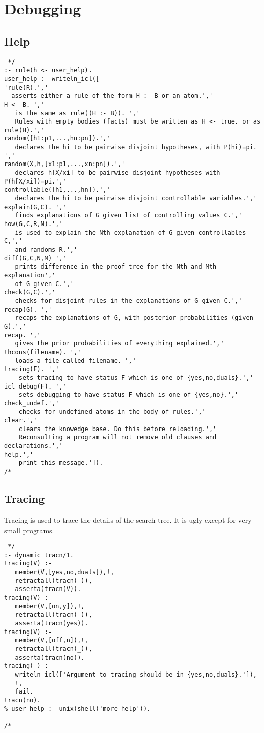 \documentclass[11pt,fleqn]{article}
\begin{document}
\section{Debugging}
\subsection{Help}
\begin{verbatim} */
:- rule(h <- user_help).
user_help :- writeln_icl([
'rule(R).','
  asserts either a rule of the form H :- B or an atom.','
H <- B. ','
   is the same as rule((H :- B)). ','
   Rules with empty bodies (facts) must be written as H <- true. or as rule(H).','
random([h1:p1,...,hn:pn]).','
   declares the hi to be pairwise disjoint hypotheses, with P(hi)=pi. ','
random(X,h,[x1:p1,...,xn:pn]).','
   declares h[X/xi] to be pairwise disjoint hypotheses with P(h[X/xi])=pi.','
controllable([h1,...,hn]).','
   declares the hi to be pairwise disjoint controllable variables.','
explain(G,C). ','
   finds explanations of G given list of controlling values C.','
how(G,C,R,N).','
   is used to explain the Nth explanation of G given controllables C,','
   and randoms R.',' 
diff(G,C,N,M) ','
   prints difference in the proof tree for the Nth and Mth explanation','
   of G given C.','
check(G,C).','
   checks for disjoint rules in the explanations of G given C.','
recap(G). ','
   recaps the explanations of G, with posterior probabilities (given G).','
recap. ','
   gives the prior probabilities of everything explained.','
thcons(filename). ','
   loads a file called filename. ','
tracing(F). ','
    sets tracing to have status F which is one of {yes,no,duals}.','
icl_debug(F). ','
    sets debugging to have status F which is one of {yes,no}.','
check_undef.','
    checks for undefined atoms in the body of rules.','
clear.','
    clears the knowedge base. Do this before reloading.','
    Reconsulting a program will not remove old clauses and declarations.','
help.','
    print this message.']).
/* \end{verbatim}

\subsection{Tracing}
Tracing is used to trace the details of the search tree. It is ugly
except for very small programs.
\begin{verbatim} */
:- dynamic tracn/1.
tracing(V) :-
   member(V,[yes,no,duals]),!,
   retractall(tracn(_)),
   asserta(tracn(V)).
tracing(V) :-
   member(V,[on,y]),!,
   retractall(tracn(_)),
   asserta(tracn(yes)).
tracing(V) :-
   member(V,[off,n]),!,
   retractall(tracn(_)),
   asserta(tracn(no)).
tracing(_) :-
   writeln_icl(['Argument to tracing should be in {yes,no,duals}.']),
   !,
   fail.
tracn(no).
% user_help :- unix(shell('more help')).

/* \end{verbatim}
\end{document}
